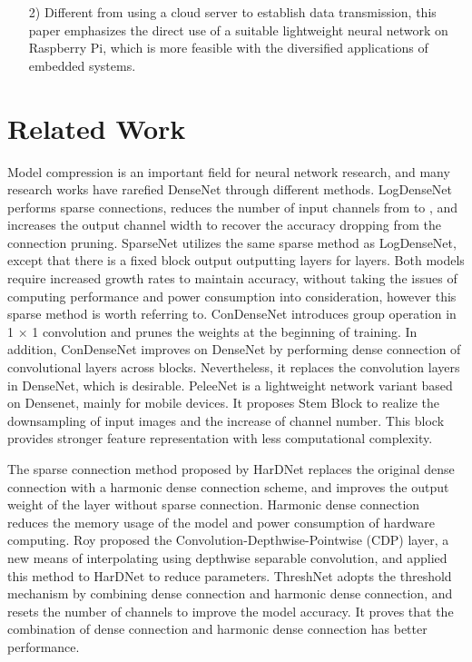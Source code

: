\documentclass[default,iicol]{sn-jnl}
\theoremstyle{thmstyleone}\newtheorem{theorem}{Theorem}\newtheorem{proposition}[theorem]{Proposition}
\theoremstyle{thmstyletwo}\newtheorem{example}{Example}\newtheorem{remark}{Remark}
\theoremstyle{thmstylethree}\newtheorem{definition}{Definition}
\begin{document}
\begin{itemize}
    \item [2)]
    Different from using a cloud server to establish data transmission, this paper emphasizes the direct use of a suitable lightweight neural network on Raspberry Pi, which is more feasible with the diversified applications of embedded systems.
\end{itemize}


\section{Related Work}
Model compression is an important field for neural network research, and many research works have rarefied DenseNet through different methods. LogDenseNet \cite{hu2017log} performs sparse connections, reduces the number of input channels from  to , and increases the output channel width to recover the accuracy dropping from the connection pruning. SparseNet \cite{liu2018sparsenet} utilizes the same sparse method as LogDenseNet, except that there is a fixed block output outputting  layers for  layers. Both models require increased growth rates to maintain accuracy, without taking the issues of computing performance and power consumption into consideration, however this sparse method is worth referring to. ConDenseNet \cite{huang2018condensenet} introduces group operation in 1 × 1 convolution and prunes the weights at the beginning of training. In addition, ConDenseNet improves on DenseNet by performing dense connection of convolutional layers across blocks. Nevertheless, it replaces the convolution layers in DenseNet, which is desirable. PeleeNet \cite{wang2018pelee} is a lightweight network variant based on Densenet, mainly for mobile devices. It proposes Stem Block to realize the downsampling of input images and the increase of channel number. This block provides stronger feature representation with less computational complexity.

The sparse connection method proposed by HarDNet \cite{chao2019hardnet} replaces the original dense connection with a harmonic dense connection scheme, and improves the output weight of the layer without sparse connection. Harmonic dense connection reduces the memory usage of the model and power consumption of hardware computing. Roy \cite{miles2021compressing} proposed the Convolution-Depthwise-Pointwise (CDP) layer, a new means of interpolating using depthwise separable convolution, and applied this method to HarDNet to reduce parameters. ThreshNet \cite{ju2022threshnet} adopts the threshold mechanism by combining dense connection and harmonic dense connection, and resets the number of channels to improve the model accuracy. It proves that the combination of dense connection and harmonic dense connection has better performance.
\end{document}
